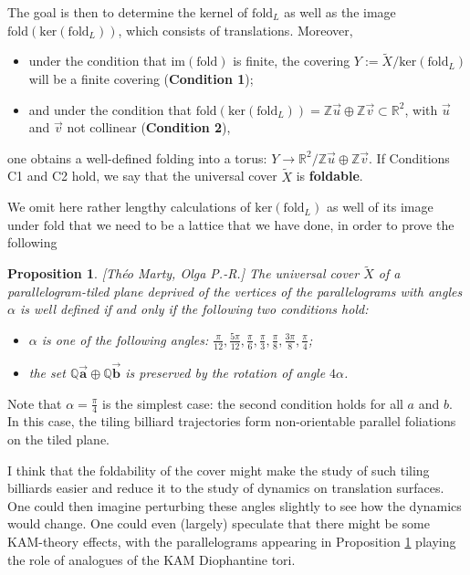 \documentclass[11pt]{article}
\newtheorem{proposition}[theorem]{Proposition}
\theoremstyle{definition}
\begin{document}
The goal is then to determine the kernel of $\mathrm{fold}_L$ as well as the image $\mathrm{fold} \left(\mathrm{ker} (\mathrm{fold}_L)\right)$, which consists of translations.
Moreover,

\begin{itemize}
    \item [C1.] under the condition that $ \mathrm{im} \left(\mathrm{fold}\right) $ is finite, the covering $Y:= \widetilde{X} / \mathrm{ker} (\mathrm{fold}_L)$ will be a finite covering (\textbf{Condition 1});
    \item[C2.] and under the condition that $\mathrm{fold} \left(\mathrm{ker} ( \mathrm{fold}_L)\right) =\mathbb{Z} \Vec{u} \oplus \mathbb{Z} \Vec{v} \subset \mathbb{R}^2$, with $\Vec{u}$ and $\Vec{v}$ not collinear (\textbf{Condition 2}),
\end{itemize}    
one obtains a well-defined folding into a torus: $Y \rightarrow \mathbb{R}^2 / \mathbb{Z} \Vec{u} \oplus  \mathbb{Z} \Vec{v}.$ If Conditions C1 and C2 hold, we say that the universal cover $\widetilde{X}$ is \textbf{foldable}.

We omit here rather lengthy calculations of $\mathrm{ker} (\mathrm{fold}_L)$ as well of its image under $\mathrm{fold}$ that we need to be a lattice that we have done, in order to prove the following 

\begin{proposition}\label{Prop_angles_for_cover}[{Théo Marty, Olga P.-R.}]
The universal cover $\widetilde{X}$ of a parallelogram-tiled plane deprived of the vertices of the parallelograms with angles $\alpha$ is well defined if and only if the following two conditions hold:
\begin{itemize}
\item[1.] $\alpha$ is one of the following angles:
$\frac{\pi}{12}, \frac{5 \pi}{12}, \frac{\pi}{6}, \frac{\pi}{3}, \frac{\pi}{8}, \frac{3\pi}{8}, \frac{\pi}{4}$;
\item[2.] the set $\mathbb{Q} \Vec{\boldsymbol{a}} \oplus \mathbb{Q} \Vec{\boldsymbol{b}}$ is preserved by the rotation of angle $4 \alpha$.
\end{itemize}
\end{proposition}

Note that $\alpha=\frac{\pi}{4}$ is the simplest case: the second condition holds for all $a$ and $b$. In this case, the tiling billiard trajectories form non-orientable parallel foliations on the tiled plane.

I think that the foldability of the cover might make the study of such tiling billiards easier and reduce it to the study of dynamics on translation surfaces. One could then imagine perturbing these angles slightly to see how the dynamics would change. One could even (largely) speculate that there might be some KAM-theory effects, with the parallelograms appearing in Proposition \ref{Prop_angles_for_cover} playing the role of analogues of the KAM Diophantine tori. 
\end{document}
